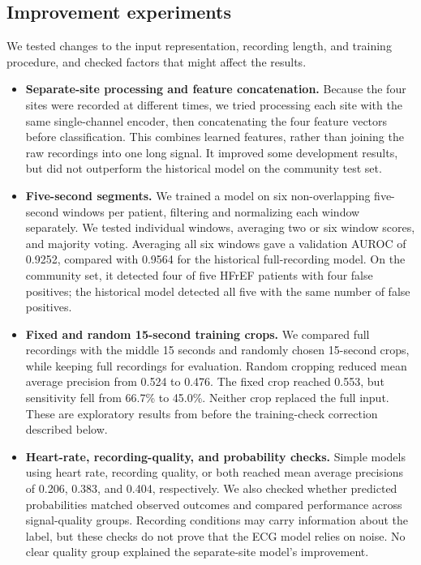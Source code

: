 \documentclass[11pt,a4paper]{article}
\newcommand{\draftnote}[1]{\par\smallskip\noindent\textcolor{blue}{\textbf{To write:} #1}\par\smallskip}
\begin{document}

\subsection{Improvement experiments}
We tested changes to the input representation, recording length, and
training procedure, and checked factors that might affect the results.

\begin{itemize}
\item \textbf{Separate-site processing and feature concatenation.}
Because the four sites were recorded at different times, we tried processing
each site with the same single-channel encoder, then concatenating the four
feature vectors before classification. This combines learned features,
rather than joining the raw recordings into one long signal. It improved
some development results, but did not outperform the historical model on
the community test set.

\item \textbf{Five-second segments.}
We trained a model on six non-overlapping five-second windows per patient,
filtering and normalizing each window separately. We tested individual
windows, averaging two or six window scores, and majority voting.
Averaging all six windows gave a validation AUROC of 0.9252, compared with
0.9564 for the historical full-recording model. On the community set, it
detected four of five HFrEF patients with four false positives; the
historical model detected all five with the same number of false positives.

\item \textbf{Fixed and random 15-second training crops.}
We compared full recordings with the middle 15 seconds and randomly chosen
15-second crops, while keeping full recordings for evaluation. Random
cropping reduced mean average precision from 0.524 to 0.476. The fixed
crop reached 0.553, but sensitivity fell from 66.7\% to 45.0\%.
Neither crop replaced the full input. These are exploratory results from
before the training-check correction described below.

\item \textbf{Heart-rate, recording-quality, and probability checks.}
Simple models using heart rate, recording quality, or both reached mean
average precisions of 0.206, 0.383, and 0.404, respectively. We also checked
whether predicted probabilities matched observed outcomes and compared
performance across signal-quality groups. Recording conditions may carry
information about the label, but these checks do not prove that the ECG
model relies on noise. No clear quality group explained the separate-site
model's improvement.


\end{itemize}
\end{document}
